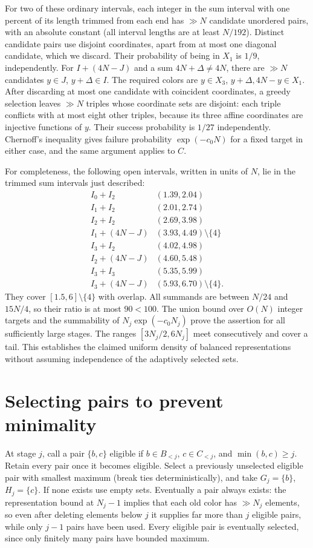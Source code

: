 \documentclass[11pt]{article}
\begin{document}
For two of these ordinary intervals, each integer in the sum interval with one percent of its length trimmed from each end has $\gg N$ candidate unordered pairs, with an absolute constant (all interval lengths are at least $N/192$). Distinct candidate pairs use disjoint coordinates, apart from at most one diagonal candidate, which we discard. Their probability of being in $X_1$ is $1/9$, independently. For $I+(4N-J)$ and a sum $4N+\Delta\ne4N$, there are $\gg N$ candidates $y\in J$, $y+\Delta\in I$. The required colors are $y\in X_3$, $y+\Delta,4N-y\in X_1$. After discarding at most one candidate with coincident coordinates, a greedy selection leaves $\gg N$ triples whose coordinate sets are disjoint: each triple conflicts with at most eight other triples, because its three affine coordinates are injective functions of $y$. Their success probability is $1/27$ independently. Chernoff's inequality gives failure probability $\exp(-c_0N)$ for a fixed target in either case, and the same argument applies to $C$.

For completeness, the following open intervals, written in units of $N$, lie in the trimmed sum intervals just described:
\[
\begin{array}{c|c}
I_0+I_2&(1.39,2.04)\\
I_1+I_2&(2.01,2.74)\\
I_2+I_2&(2.69,3.98)\\
I_1+(4N-J)&(3.93,4.49)\setminus\{4\}\\
I_3+I_2&(4.02,4.98)\\
I_2+(4N-J)&(4.60,5.48)\\
I_3+I_3&(5.35,5.99)\\
I_3+(4N-J)&(5.93,6.70)\setminus\{4\}.
\end{array}
\]
They cover $[1.5,6]\setminus\{4\}$ with overlap. All summands are between $N/24$ and $15N/4$, so their ratio is at most $90<100$. The union bound over $O(N)$ integer targets and the summability of $N_j\exp(-c_0N_j)$ prove the assertion for all sufficiently large stages. The ranges $[3N_j/2,6N_j]$ meet consecutively and cover a tail. This establishes the claimed uniform density of balanced representations without assuming independence of the adaptively selected sets.

\section*{Selecting pairs to prevent minimality}
At stage $j$, call a pair $\{b,c\}$ eligible if $b\in B_{<j}$, $c\in C_{<j}$, and $\min(b,c)\ge j$. Retain every pair once it becomes eligible. Select a previously unselected eligible pair with smallest maximum (break ties deterministically), and take $G_j=\{b\}$, $H_j=\{c\}$. If none exists use empty sets. Eventually a pair always exists: the representation bound at $N_j-1$ implies that each old color has $\gg N_j$ elements, so even after deleting elements below $j$ it supplies far more than $j$ eligible pairs, while only $j-1$ pairs have been used. Every eligible pair is eventually selected, since only finitely many pairs have bounded maximum.
\end{document}
